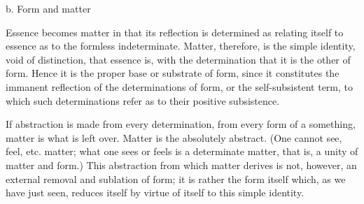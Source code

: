 b. Form and matter

Essence becomes matter in that its reflection is
determined as relating itself
to essence as to the formless indeterminate.
Matter, therefore, is the simple identity,
void of distinction, that essence is,
with the determination that it is the other of form.
Hence it is the proper base or substrate of form,
since it constitutes the immanent reflection
of the determinations of form,
or the self-subsistent term,
to which such determinations refer
as to their positive subsistence.

If abstraction is made from every determination,
from every form of a something, matter is what is left over.
Matter is the absolutely abstract.
(One cannot see, feel, etc. matter;
what one sees or feels is a determinate matter,
that is, a unity of matter and form.)
This abstraction from which matter derives is not, however,
an external removal and sublation of form;
it is rather the form itself which, as we have just seen,
reduces itself by virtue of itself to this simple identity.

